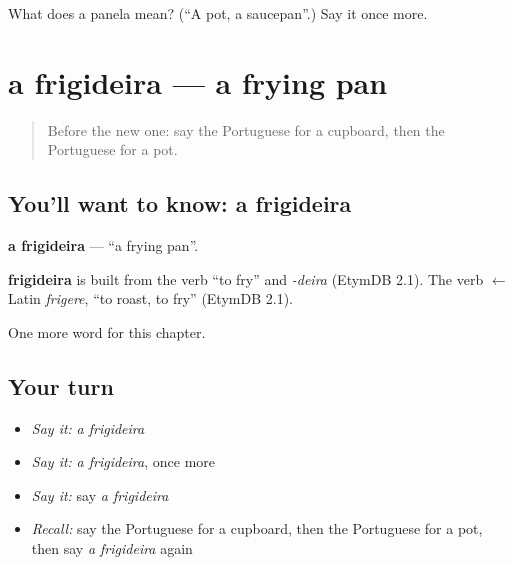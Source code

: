 \begin{tcolorbox}[breakable,colback=teal!4,colframe=teal!35!black,title={Before you move on}]
What does a panela mean? (\textquotedblleft{}A pot, a saucepan\textquotedblright{}.) Say it once more.
\end{tcolorbox}
\section[a frigideira]{a frigideira — a frying pan}

\label{lesson:PT-C97-frigideira}



\begin{quote}
Before the new one: say the Portuguese for a cupboard, then the Portuguese for a pot.
\end{quote}

\subsection*{You'll want to know: a frigideira}
\textbf{a frigideira} — \textquotedblleft{}a frying pan\textquotedblright{}.

\begin{cousinweb}
\textbf{frigideira} is built from the verb \textquotedblleft{}to fry\textquotedblright{} and \emph{-deira} (EtymDB 2.1). The verb $\leftarrow$ Latin \emph{frigere}, \textquotedblleft{}to roast, to fry\textquotedblright{} (EtymDB 2.1).
\end{cousinweb}

\begin{grammarlens}[title={What you've built}]
One more word for this chapter.
\end{grammarlens}

\subsection*{Your turn}
\begin{itemize}
\raggedright
  \item \emph{Say it:} \emph{a frigideira}
  \item \emph{Say it:} \emph{a frigideira}, once more
  \item \emph{Say it:} say \emph{a frigideira}
  \item \emph{Recall:} say the Portuguese for a cupboard, then the Portuguese for a pot, then say \emph{a frigideira} again
\end{itemize}

